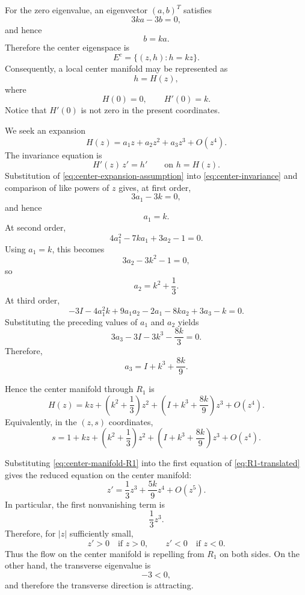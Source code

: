 \documentclass[11pt,reqno]{amsart}
\theoremstyle{plain}
\theoremstyle{definition}
\theoremstyle{remark}
\begin{document}
For the zero eigenvalue, an eigenvector $(a,b)^T$ satisfies
\[
3ka-3b=0,
\]
and hence
\[
b=ka.
\]
Therefore the center eigenspace is
\[
E^c=\{(z,h):h=kz\}.
\]
Consequently, a local center manifold may be represented as
\[
h=H(z),
\]
where
\begin{equation}
\label{eq:center-tangency}
H(0)=0,
\qquad
H'(0)=k.
\end{equation}
Notice that $H'(0)$ is not zero in the present coordinates.

We seek an expansion
\begin{equation}
\label{eq:center-expansion-assumption}
H(z)
=
a_1z+a_2z^2+a_3z^3+O(z^4).
\end{equation}
The invariance equation is
\begin{equation}
\label{eq:center-invariance}
H'(z)\,z'
=
h'
\qquad\text{on }h=H(z).
\end{equation}
Substitution of \eqref{eq:center-expansion-assumption} into
\eqref{eq:center-invariance} and comparison of like powers of $z$
gives, at first order,
\[
3a_1-3k=0,
\]
and hence
\[
a_1=k.
\]
At second order,
\[
4a_1^2-7ka_1+3a_2-1=0.
\]
Using $a_1=k$, this becomes
\[
3a_2-3k^2-1=0,
\]
so
\[
a_2=k^2+\frac13.
\]
At third order,
\[
-3I
-4a_1^2k
+9a_1a_2
-2a_1
-8ka_2
+3a_3-k
=0.
\]
Substituting the preceding values of $a_1$ and $a_2$ yields
\[
3a_3
-3I
-3k^3
-\frac{8k}{3}
=0.
\]
Therefore,
\[
a_3
=
I+k^3+\frac{8k}{9}.
\]

Hence the center manifold through $R_1$ is
\begin{equation}
\label{eq:center-manifold-R1}
\boxed{
H(z)
=
kz
+
\left(k^2+\frac13\right)z^2
+
\left(
I+k^3+\frac{8k}{9}
\right)z^3
+
O(z^4).
}
\end{equation}
Equivalently, in the $(z,s)$ coordinates,
\[
s
=
1+kz
+
\left(k^2+\frac13\right)z^2
+
\left(
I+k^3+\frac{8k}{9}
\right)z^3
+
O(z^4).
\]

Substituting \eqref{eq:center-manifold-R1} into the first equation of
\eqref{eq:R1-translated} gives the reduced equation on the center
manifold:
\begin{equation}
\label{eq:reduced-R1}
\boxed{
z'
=
\frac13z^3
+
\frac{5k}{9}z^4
+
O(z^5).
}
\end{equation}
In particular, the first nonvanishing term is
\[
\frac13z^3.
\]
Therefore, for $|z|$ sufficiently small,
\[
z'>0
\quad\text{if }z>0,
\qquad
z'<0
\quad\text{if }z<0.
\]
Thus the flow on the center manifold is repelling from $R_1$ on both
sides. On the other hand, the transverse eigenvalue is
\[
-3<0,
\]
and therefore the transverse direction is attracting.
\end{document}
